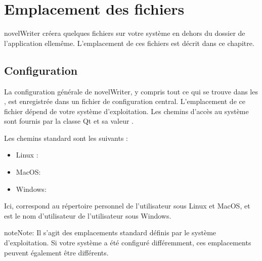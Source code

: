 \documentclass[a4paper,11pt,french]{sphinxmanual}
\begin{document}
\chapter{Emplacement des fichiers}
\label{\detokenize{tech_locations:file-locations}}\label{\detokenize{tech_locations:a-locations}}\label{\detokenize{tech_locations::doc}}
\sphinxAtStartPar
novelWriter créera quelques fichiers sur votre système en dehors du dossier de l’application elle\sphinxhyphen{}même. L’emplacement de ces fichiers est décrit dans ce chapitre.


\section{Configuration}
\label{\detokenize{tech_locations:configuration}}\label{\detokenize{tech_locations:a-locations-conf}}
\sphinxAtStartPar
La configuration générale de novelWriter, y compris tout ce qui se trouve dans les , est enregistrée dans un fichier de configuration central. L’emplacement de ce fichier dépend de votre système d’exploitation. Les chemins d’accès au système sont fournis par la classe Qt  et sa valeur .

\sphinxAtStartPar
Les chemins standard sont les suivants :
\begin{itemize}
\item {} 
\sphinxAtStartPar
Linux : 

\item {} 
\sphinxAtStartPar
MacOS: 

\item {} 
\sphinxAtStartPar
Windows: 

\end{itemize}

\sphinxAtStartPar
Ici, \sphinxcode{\sphinxupquote{\textasciitilde{}}} correspond au répertoire personnel de l’utilisateur sous Linux et MacOS, et  est le nom d’utilisateur de l’utilisateur sous Windows.

\begin{sphinxadmonition}{note}{Note:}
\sphinxAtStartPar
Il s’agit des emplacements standard définis par le système d’exploitation. Si votre système a été configuré différemment, ces emplacements peuvent également être différents.
\end{sphinxadmonition}
\end{document}
